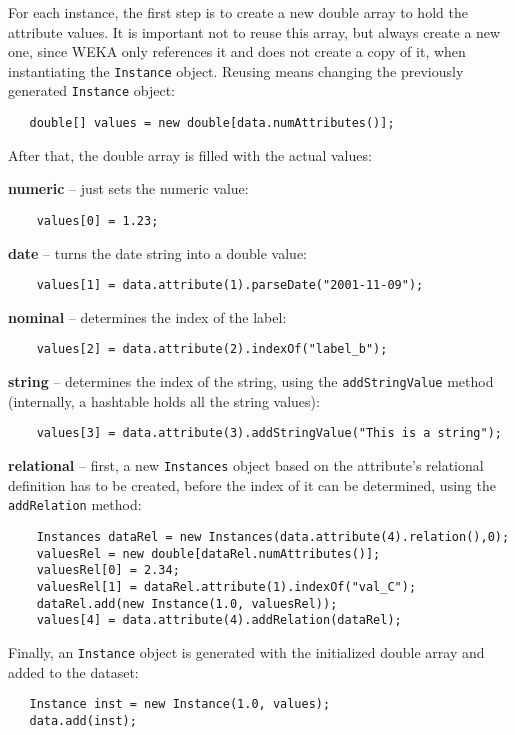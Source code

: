\newpage

For each instance, the first step is to create a new double array to hold the
attribute values. It is important not to reuse this array, but always create a
new one, since WEKA only references it and does not create a copy of it, when
instantiating the \texttt{Instance} object. Reusing means changing the
previously generated \texttt{Instance} object:
\begin{verbatim}
   double[] values = new double[data.numAttributes()];
\end{verbatim}
After that, the double array is filled with the actual values:
\begin{tight_itemize}
	\item \textbf{numeric} -- just sets the numeric value:
	\begin{verbatim}
	values[0] = 1.23;
	\end{verbatim}

	\item \textbf{date} -- turns the date string into a double value:
	\begin{verbatim}
	values[1] = data.attribute(1).parseDate("2001-11-09");
	\end{verbatim}

	\item \textbf{nominal} -- determines the index of the label:
	\begin{verbatim}
	values[2] = data.attribute(2).indexOf("label_b");
	\end{verbatim}

	\item \textbf{string} -- determines the index of the string, using the
\texttt{addStringValue} method (internally, a hashtable holds all the string
values):
	\begin{verbatim}
	values[3] = data.attribute(3).addStringValue("This is a string");
	\end{verbatim}

	\item \textbf{relational} -- first, a new \texttt{Instances} object based
on the attribute's relational definition has to be created, before the index
of it can be determined, using the \texttt{addRelation} method:
	\begin{verbatim}
	Instances dataRel = new Instances(data.attribute(4).relation(),0);
	valuesRel = new double[dataRel.numAttributes()];
	valuesRel[0] = 2.34;
	valuesRel[1] = dataRel.attribute(1).indexOf("val_C");
	dataRel.add(new Instance(1.0, valuesRel));
	values[4] = data.attribute(4).addRelation(dataRel);
	\end{verbatim}
\end{tight_itemize}
Finally, an \texttt{Instance} object is generated with the initialized double
array and added to the dataset:
\begin{verbatim}
   Instance inst = new Instance(1.0, values);
   data.add(inst);
\end{verbatim}


